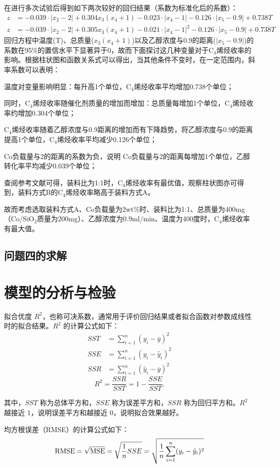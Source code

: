 \documentclass[a4paper,10.5pt]{ctexart}
\begin{document}
在进行多次试验后得到如下两次较好的回归结果（系数为标准化后的系数）：
\begin{equation}
\begin{aligned}
\nonumber
z&=-0.039\cdot |x_2-2|+0.304x_3(x_4+1)-0.023\cdot |x_4-1|-0.126\cdot |x_5-0.9|+0.738T\\
z&=-0.039\cdot |x_2-2|+0.305x_3(x_4+1)-0.021\cdot |x_4-1|^2-0.126\cdot |x_5-0.9|+0.738T
\end{aligned}
\end{equation}
回归方程中温度(T)、总质量($x_3(x_4+1)$)以及乙醇浓度与0.9的距离($|x_5-0.9|$)的系数在95\%的置信水平下显著异于0，故而下面探讨这几种变量对于C$_4$烯烃收率的影响。根据柱状图和函数关系式可以得出，当其他条件不变时，在一定范围内，斜率系数可以表明：
\par 温度对变量影响明显：每升高1个单位，C$_4$烯烃收率平均增加0.738个单位；
\par 同时，C$_4$烯烃收率随催化剂质量的增加而增加：总质量每增加1个单位，C$_4$烯烃收率约增加0.304个单位；
\par C$_4$烯烃收率随着乙醇浓度与0.9距离的增加而有下降趋势，将乙醇浓度与0.9的距离提高1个单位，C$_4$烯烃收率平均减少0.126个单位；
\par Co负载量与2的距离的系数为负，说明 Co负载量与2的距离每增加1个单位，乙醇转化率平均减少0.039个单位；
\par 查阅参考文献可得，装料比为1:1时，C$_4$烯烃收率有最优值，观察柱状图亦可得到，装料方式B的C$_4$烯烃收率略高于装料方式A。

故而考虑选取装料方式A、Co负载量为2wt\%时、装料比为1:1、总质量为400mg（Co/SiO$_2$质量为200mg）、乙醇浓度为0.9ml/min、温度为400度时，C$_4$烯烃收率有最大值。
~\\

\subsection{问题四的求解}

\section{模型的分析与检验}
\par 拟合优度 $R^2$，也称可决系数，通常用于评价回归结果或者拟合函数对参数成线性时的拟合结果。$R^2$ 的计算公式如下：
\begin{equation}
\begin{aligned}
\nonumber
SST &= \sum_{i=1}^{n}(y_i-\overline{y})^2\\
SSE &= \sum_{i=1}^{n}(y_i-\hat{y}_i)^2\\
SSR &= \sum_{i=1}^{n}(\hat{y}_i-\overline{y})^2
\end{aligned}
\end{equation}
$$R^2=\frac{SSR}{SST}=1-\frac{SSE}{SST}.$$
\par 其中，$SST$ 称为总体平方和，$SSE$ 称为误差平方和，$SSR$ 称为回归平方和。$R^2$ 越接近 $1$，说明误差平方和越接近 $0$，说明拟合效果越好。
\par 均方根误差（RMSE）的计算公式如下：
$$ {\rm RMSE}=\sqrt{{\rm MSE}}=\sqrt{\frac{1}{n}SSE}=\sqrt{\frac{1}{n}\sum_{i=1}^{n}(y_i-\hat{y}_i)^2}$$
\end{document}
